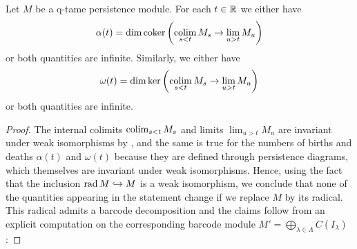 \begin{lem}
\label{lem:birth_death_formulas}
	Let $M$ be a q-tame persistence module.
	For each $t \in \mathbb{R}$ we either have
	\[
		\alpha(t) = \dim \operatorname{coker} \left( \operatorname*{colim}_{s < t} M_{s} \to \lim_{u > t} M_{u} \right)
	\]
	or both quantities are infinite.
	Similarly, we either have
	\[
		\omega(t) = \dim \ker \left( \operatorname*{colim}_{s < t} M_{s} \to \lim_{u > t} M_{u} \right)
	\]
	or both quantities are infinite.
\end{lem}
\begin{proof}
	The internal colimits $\operatorname*{colim}_{s < t} M_{s}$ and limits $\lim_{u > t} M_{u}$ are invariant under weak isomorphisms by \cite[Lemmas 3.5 and 3.6]{Schmahl.2021}, and the same is true for the numbers of births and deaths $\alpha(t)$ and $\omega(t)$ because they are defined through persistence diagrams, which themselves are invariant under weak isomorphisms.
	Hence, using the fact that the inclusion $\operatorname{rad} M \hookrightarrow M$ is a weak isomorphism, we conclude that none of the quantities appearing in the statement change if we replace $M$ by its radical.
	This radical admits a barcode decomposition and the claims follow from an explicit computation on the corresponding barcode module $M' = \bigoplus_{\lambda \in \Lambda} C(I_\lambda)$:


\end{proof}
